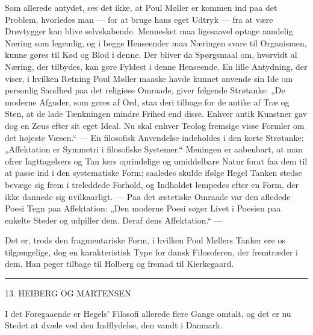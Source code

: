 \documentclass[12pt,a4paper,openany]{book}
\newcommand{\opage}[1]{\marginnote{\footnotesize\textit{[#1]}}}
\begin{document}
Som allerede antydet, ses det ikke, at Poul Møller er kommen ind paa det
Problem, hvorledes man --- for at bruge hans eget Udtryk --- fra at være
Drøvtygger kan blive selvskabende. Mennesket maa ligesaavel optage aandelig
Næring som legemlig, og i begge Henseender maa Næringen svare til Organismen,
kunne gøres til Kød og Blod i denne. Der bliver da Spørgsmaal om, hvorvidt al
Næring, der tilbydes, kan gøre Fyldest i denne Henseende. En lille Antydning,
der viser, i hvilken Retning Poul Møller maaske havde kunnet anvende sin Ide om
personlig Sandhed paa det religiøse Omraade, giver følgende Strøtanke: „De
moderne Afguder, som gøres af Ord, staa deri tilbage for de antike af Træ og
Sten, at de lade Tænkningen mindre Frihed end disse. Enhver antik Kunstner gav
dog en Zeus efter sit eget Ideal. Nu skal enhver Teolog fremsige visse Formler
om det højeste Væsen.“ --- En filosofisk Anvendelse indeholdes i den korte
Strøtanke: „Affektation er Symmetri i filosofiske Systemer.“ Meningen er
aabenbart, at man ofrer Iagttagelsers og Tan%
\setcounter{footnote}{0}%
\opage{127}kers oprindelige og umiddelbare Natur forat faa dem til at passe ind
i den systematiske Form; saaledes skulde ifølge Hegel Tanken stedse bevæge sig
frem i treleddede Forhold, og Indholdet lempedes efter en Form, der ikke
dannede sig uvilkaarligt. --- Paa det æstetiske Omraade var den afledede Poesi
Tegn paa Affektation: „Den moderne Poesi søger Livet i Poesien paa enkelte
Steder og udpiller dem. Deraf dens Affektation.“ ---

Det er, trods den fragmentariske Form, i hvilken Poul Møllers Tanker ere os
tilgængelige, dog en karakteristisk Type for dansk Filosoferen, der fremtræder
i dem. Han peger tilbage til Holberg og fremad til Kierkegaard.

\begin{center}\rule{2cm}{0.4pt}\end{center}

\setcounter{footnote}{0}%
\opage{128}

\begin{center}\large 13. HEIBERG OG MARTENSEN\end{center}

I det Foregaaende er Hegels' Filosofi allerede flere Gange omtalt, og det er nu
Stedet at dvæle ved den Indflydelse, den vandt i Danmark.
\end{document}

